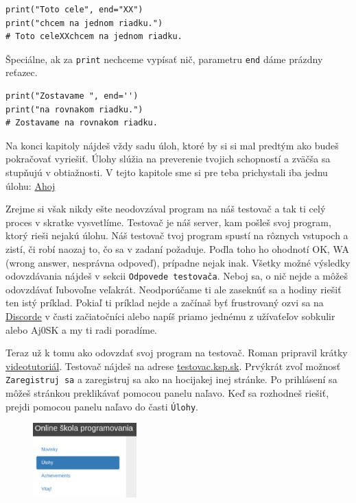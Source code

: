 \documentclass{article}
\begin{document}
\begin{lstlisting}
print("Toto cele", end="XX")
print("chcem na jednom riadku.")
# Toto celeXXchcem na jednom riadku.
\end{lstlisting}

Špeciálne, ak za \texttt{print} nechceme vypísať nič, parametru \texttt{end} dáme prázdny reťazec.
\begin{lstlisting}
print("Zostavame ", end='')
print("na rovnakom riadku.")
# Zostavame na rovnakom riadku.
\end{lstlisting}


Na konci kapitoly nájdeš vždy sadu úloh, ktoré by si si mal predtým ako budeš pokračovať vyriešiť. Úlohy slúžia na preverenie tvojich schopností a zväčša sa stupňujú v obtiažnosti. V tejto kapitole sme si pre teba prichystali iba jednu úlohu: \href{https://testovac.ksp.sk/tasks/ls-uvod-ahoj/}{Ahoj}

Zrejme si však nikdy ešte neodovzával program na náš testovač a tak ti celý proces v skratke vysvetlíme. Testovač je náš server, kam pošleš svoj program, ktorý rieši nejakú úlohu. Náš testovač tvoj program spustí na rôznych vstupoch a zistí, či robí naozaj to, čo sa v zadaní požaduje. Poďla toho ho ohodnotí OK, WA (wrong answer, nesprávna odpoveď), prípadne nejak inak. Všetky možné výsledky odovzdávania nájdeš v sekcii \texttt{Odpovede testovača}. Neboj sa, o nič nejde a môžeš odovzdávať ľubovoľne veľakrát. Neodporúčame ti ale zaseknúť sa a hodiny riešiť ten istý príklad. Pokiaľ ti príklad nejde a začínaš byť frustrovaný ozvi sa na \href{https://discord.gg/QKgNmW9}{Discorde} v časti začiatočníci alebo napíš priamo jednému z užívaťeľov sobkulir alebo Aj0SK a my ti radi poradíme.

Teraz už k tomu ako odovzdať svoj program na testovač. Roman pripravil krátky \href{https://www.youtube.com/watch?v=RV5uoLwQDsg}{videotutoriál}. Testovač nájdeš na adrese \href{https://testovac.ksp.sk/}{testovac.ksp.sk}. Prvýkrát zvoľ možnosť \texttt{Zaregistruj sa} a zaregistruj sa ako na hocijakej inej stránke. Po prihlásení sa môžeš stránkou preklikávať pomocou panelu naľavo. Keď sa rozhodneš riešiť, prejdi pomocou panelu naľavo do časti \texttt{Úlohy}.

\begin{figure}[h]
\includegraphics[width=4cm]{lavypanel}
\centering
\end{figure}
\end{document}
